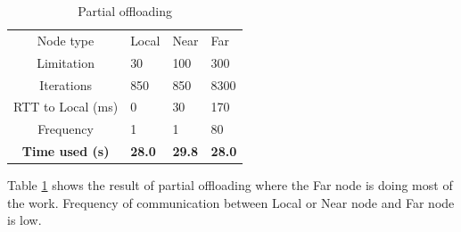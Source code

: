 \begin{table}[h!]
    \centering
    \begin{tabular}[c]{c|p{2cm}p{2cm}p{2cm}}

        Node type & Local & Near & Far \\

        Limitation          & 30 & 100 & 300  \\

        Iterations          & 850 & 850 & 8300  \\

        RTT to Local (ms)   & 0 & 30 & 170 \\

        Frequency           & 1 & 1 & 80 \\

        \hline
        \textbf{Time used (s)}       & \textbf{28.0} & \textbf{29.8} & \textbf{28.0} \\

    \end{tabular}
    \caption{Partial offloading}
    \label{tab:MEC_partial_offloading_low_frequency}
\end{table}

Table \ref{tab:MEC_partial_offloading_low_frequency} shows the result of partial offloading where the Far node is doing most of the work. Frequency of communication between Local or Near node and Far node is low. 


